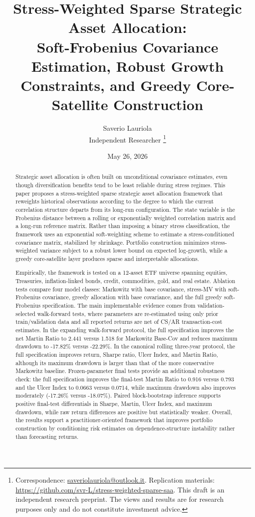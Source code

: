 \documentclass[11pt]{article}
\title{\textbf{Stress-Weighted Sparse Strategic Asset Allocation:}\\
\large Soft-Frobenius Covariance Estimation, Robust Growth Constraints, and Greedy Core-Satellite Construction}
\author{
Saverio Lauriola\\
\small Independent Researcher
\thanks{Correspondence: \href{mailto:saveriolauriola@outlook.it}{saveriolauriola@outlook.it}. Replication materials: \url{https://github.com/svr-L/stress-weighted-sparse-saa}. This draft is an independent research preprint. The views and results are for research purposes only and do not constitute investment advice.}
}
\date{May 26, 2026}
\begin{document}
\maketitle

\begin{abstract}
Strategic asset allocation is often built on unconditional covariance estimates, even though diversification benefits tend to be least reliable during stress regimes. This paper proposes a stress-weighted sparse strategic asset allocation framework that reweights historical observations according to the degree to which the current correlation structure departs from its long-run configuration. The state variable is the Frobenius distance between a rolling or exponentially weighted correlation matrix and a long-run reference matrix. Rather than imposing a binary stress classification, the framework uses an exponential soft-weighting scheme to estimate a stress-conditioned covariance matrix, stabilized by shrinkage. Portfolio construction minimizes stress-weighted variance subject to a robust lower bound on expected log-growth, while a greedy core-satellite layer produces sparse and interpretable allocations.

Empirically, the framework is tested on a 12-asset ETF universe spanning equities, Treasuries, inflation-linked bonds, credit, commodities, gold, and real estate. Ablation tests compare four model classes: Markowitz with base covariance, stress-MV with soft-Frobenius covariance, greedy allocation with base covariance, and the full greedy soft-Frobenius specification. The main implementable evidence comes from validation-selected walk-forward tests, where parameters are re-estimated using only prior train/validation data and all reported returns are net of CS/AR transaction-cost estimates. In the expanding walk-forward protocol, the full specification improves the net Martin Ratio to 2.441 versus 1.518 for Markowitz Base-Cov and reduces maximum drawdown to -17.82\% versus -22.29\%. In the canonical rolling three-year protocol, the full specification improves return, Sharpe ratio, Ulcer Index, and Martin Ratio, although its maximum drawdown is larger than that of the more conservative Markowitz baseline. Frozen-parameter final tests provide an additional robustness check: the full specification improves the final-test Martin Ratio to 0.916 versus 0.793 and the Ulcer Index to 0.0663 versus 0.0714, while maximum drawdown also improves moderately (-17.26\% versus -18.07\%). Paired block-bootstrap inference supports positive final-test differentials in Sharpe, Martin, Ulcer Index, and maximum drawdown, while raw return differences are positive but statistically weaker. Overall, the results support a practitioner-oriented framework that improves portfolio construction by conditioning risk estimates on dependence-structure instability rather than forecasting returns.
\end{abstract}
\end{document}
